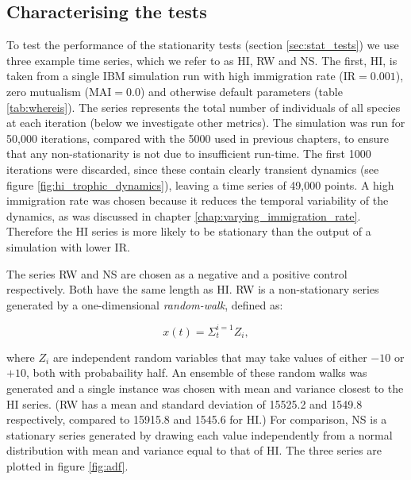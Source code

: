 \subsection{Characterising the tests}
\label{sec:characterising_stat_tests}


To test the performance of the stationarity tests (section \ref{sec:stat_tests}) we use three example time series, which we refer to as HI, RW and NS. The first, HI, is taken from a single IBM simulation run with high immigration rate (IR$=0.001$), zero mutualism (MAI$=0.0$) and otherwise default parameters (table \ref{tab:whereis}).  The series represents the total number of individuals of all species at each iteration (below we investigate other metrics). The simulation was run for 50,000 iterations, compared with the 5000 used in previous chapters, to ensure that any non-stationarity is not due to insufficient run-time. The first 1000 iterations were discarded, since these contain clearly transient dynamics (see figure \ref{fig:hi_trophic_dynamics}), leaving a time series of 49,000 points. A high immigration rate was chosen because it reduces the temporal variability of the dynamics, as was discussed in chapter \ref{chap:varying_immigration_rate}. Therefore the HI series is more likely to be stationary than the output of a simulation with lower IR.

The series RW and NS are chosen as a negative and a positive control respectively. Both have the same length as HI. RW is a non-stationary series generated by a one-dimensional \emph{random-walk}, defined as:

\begin{equation}
	x(t) = \Sigma_{t}^{i=1} Z_i, 
\end{equation}   

where $Z_i$ are independent random variables that may take values of either $-10$ or $+10$, both with probabaility half. An ensemble of these random walks was generated and a single instance was chosen with mean and variance closest to the HI series. (RW has a mean and standard deviation of 15525.2 and 1549.8 respectively, compared to 15915.8 and 1545.6 for HI.) For comparison, NS is a stationary series generated by drawing each value independently from a normal distribution with mean and variance  equal to that of HI. The three series are plotted in figure \ref{fig:adf}.
  
  
